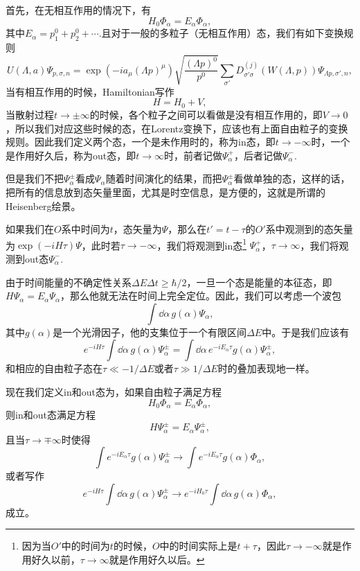 \documentclass[9pt]{extbook}
\begin{document}
首先，在无相互作用的情况下，有
\[
H_0\Phi_\alpha=E_\alpha\Phi_\alpha,
\]
其中$E_\alpha=p^0_1+p^0_2+\cdots$.且对于一般的多粒子（无相互作用）态，我们有如下变换规则
\[
U(\Lambda,a)\Psi_{p,\sigma,n}=\exp(-ia_\mu (\Lambda p)^\mu)\sqrt{\frac{(\Lambda p)^0}{p^0}}\sum_{\sigma'}D^{(j)}_{\sigma' \sigma}\left( W(\Lambda,p)\right)\Psi_{\Lambda p,\sigma',n},
\]
当有相互作用的时候，Hamiltonian写作
\[
	H=H_0+V,
\]
当散射过程$t\to\pm\infty$的时候，各个粒子之间可以看做是没有相互作用的，即$V\to 0$，所以我们对应这些时候的态，在Lorentz变换下，应该也有上面自由粒子的变换规则。因此我们定义两个态，一个是未作用时的，称为in态，即$t\to -\infty$时，一个是作用好久后，称为out态，即$t \to \infty$时，前者记做$\Psi_\alpha^+$，后者记做$\Psi_\alpha^-$.

但是我们不把$\Psi_\alpha^\pm$看成$\Psi_\alpha$随着时间演化的结果，而把$\Psi_\alpha^\pm$看做单独的态，这样的话，把所有的信息放到态矢量里面，尤其是时空信息，是方便的，这就是所谓的Heisenberg绘景。

如果我们在$O$系中时间为$t$，态矢量为$\Psi$，那么在$t'=t-\tau$的$O'$系中观测到的态矢量为$\exp(-iH\tau)\Psi$，此时若$\tau\to-\infty$，我们将观测到in态\footnote{因为当$O'$中的时间为$t$的时候，$O$中的时间实际上是$t+\tau$，因此$\tau\to -\infty$就是作用好久以前，$\tau\to \infty$就是作用好久以后。} $\Psi_\alpha^+$，$\tau\to\infty$，我们将观测到out态$\Psi_\alpha^-$.


由于时间能量的不确定性关系$\Delta E\Delta t\geq \hbar/2$，一旦一个态是能量的本征态，即$H\Psi_\alpha=E_\alpha \Psi_\alpha$，那么他就无法在时间上完全定位。因此，我们可以考虑一个波包
\[
\int \dd \alpha \, g(\alpha) \Psi_\alpha,
\]
其中$g(\alpha)$是一个光滑因子，他的支集位于一个有限区间$\Delta E$中。于是我们应该有
\[
	e^{-iH\tau}\int\dd \alpha\, g(\alpha) \Psi_\alpha^\pm=\int\dd \alpha\, e^{-iE_\alpha\tau}g(\alpha) \Psi_\alpha^\pm,
\]
和相应的自由粒子态在$\tau\ll -1/\Delta E$或者$\tau\gg 1/\Delta E$时的叠加表现地一样。

现在我们定义in和out态为，如果自由粒子满足方程
\[
H_0\Phi_\alpha=E_\alpha\Phi_\alpha,
\]
则in和out态满足方程
\[
H\Psi_\alpha^\pm=E_\alpha\Psi_\alpha^\pm,
\]
且当$\tau\to\mp\infty$时使得
\begin{equation}
\label{jianjinguanxi}
\int e^{-iE_\alpha\tau}g(\alpha) \Psi_\alpha^\pm \to \int e^{-iE_\alpha\tau}g(\alpha) \Phi_\alpha,
\end{equation}
或者写作
\[
e^{-iH\tau}\int\dd \alpha\, g(\alpha) \Psi_\alpha^\pm \to e^{-iH_0\tau}\int\dd \alpha\,g(\alpha) \Phi_\alpha,
\]
成立。
\end{document}
